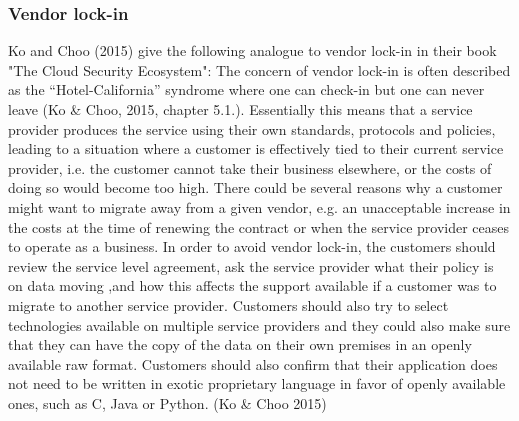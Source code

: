 \documentclass{article}
\begin{document}
\subsubsection{Vendor lock-in}
Ko and Choo (2015) give the following analogue to vendor lock-in in their book "The Cloud Security Ecosystem": The concern of vendor lock-in is often described as the “Hotel-California” syndrome where one can check-in but one can never leave (Ko \& Choo, 2015, chapter 5.1.).
Essentially this means that a service provider produces the service using their own standards, protocols and policies, leading to a situation where a customer is effectively tied to their current service provider, i.e. the customer cannot take their business elsewhere, or the costs of doing so would become too high. There could be several reasons why a customer might want to migrate away from a given vendor, e.g. an unacceptable increase in the costs at the time of renewing the contract or when the service provider ceases to operate as a business. In order to avoid vendor lock-in, the customers should review the service level agreement, ask the service provider what their policy is on data moving ,and how this affects the support available if a customer was to migrate to another service provider. Customers should also try to select technologies available on multiple service providers and they could also make sure that they can have the copy of the data on their own premises in an openly available raw format. Customers should also confirm that their application does not need to be written in exotic proprietary language in favor of openly available ones, such as C, Java or Python. (Ko \& Choo 2015)
\end{document}

